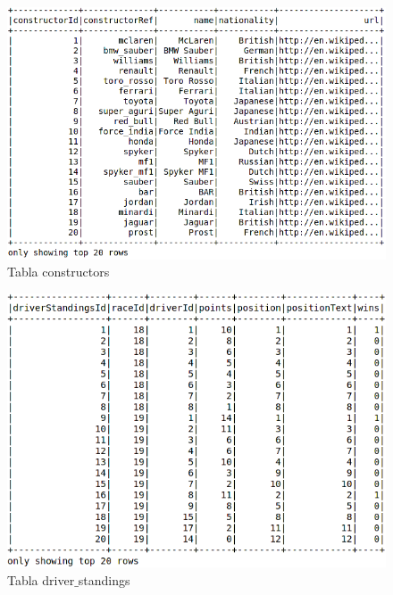\documentclass[12pt,twoside,titlepage]{report}
\begin{document}
\begin{figure}
  \includegraphics[scale=0.4]{constructors_table.png}
  \centering
  \caption{Tabla constructors}
  \label{fig:constructors}
  \centering
\end{figure}

\begin{figure}
  \includegraphics[scale=0.4]{driver_standings_table.png}
  \centering
  \caption{Tabla driver$\_$standings}
  \label{fig:drivstands}
  \centering
\end{figure}
\end{document}
